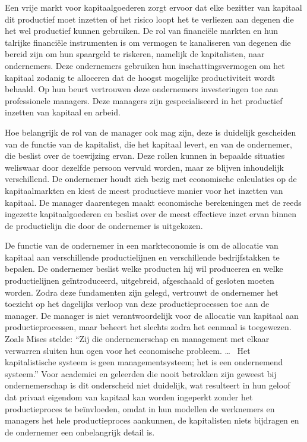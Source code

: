 Een vrije markt voor kapitaalgoederen zorgt ervoor dat elke bezitter van kapitaal dit productief moet inzetten of het risico loopt het te verliezen aan degenen die het wel productief kunnen gebruiken. De rol van financiële markten en hun talrijke financiële instrumenten is om vermogen te kanaliseren van degenen die bereid zijn om hun spaargeld te riskeren, namelijk de kapitalisten, naar ondernemers. Deze ondernemers gebruiken hun inschattingsvermogen om het kapitaal zodanig te alloceren dat de hoogst mogelijke productiviteit wordt behaald. Op hun beurt vertrouwen deze ondernemers investeringen toe aan professionele managers. Deze managers zijn gespecialiseerd in het productief inzetten van kapitaal en arbeid.

Hoe belangrijk de rol van de manager ook mag zijn, deze is duidelijk gescheiden van de functie van de kapitalist, die het kapitaal levert, en van de ondernemer, die beslist over de toewijzing ervan. Deze rollen kunnen in bepaalde situaties weliswaar door dezelfde persoon vervuld worden, maar ze blijven inhoudelijk verschillend. De ondernemer houdt zich bezig met economische calculaties op de kapitaalmarkten en kiest de meest productieve manier voor het inzetten van kapitaal. De manager daarentegen maakt economische berekeningen met de reeds ingezette kapitaalgoederen en beslist over de meest effectieve inzet ervan binnen de productielijn die door de ondernemer is uitgekozen.

De functie van de ondernemer in een markteconomie is om de allocatie van kapitaal aan verschillende productielijnen en verschillende bedrijfstakken te bepalen. De ondernemer beslist welke producten hij wil produceren en welke productielijnen geïntroduceerd, uitgebreid, afgeschaald of gesloten moeten worden. Zodra deze fundamenten zijn gelegd, vertrouwt de ondernemer het toezicht op het dagelijks verloop van deze productieprocessen toe aan de manager. De manager is niet verantwoordelijk voor de allocatie van kapitaal aan productieprocessen, maar beheert het slechts zodra het eenmaal is toegewezen. Zoals Mises stelde: ``Zij die ondernemerschap en management met elkaar verwarren sluiten hun ogen voor het economische probleem. \ldots~ Het kapitalistische systeem is geen managementsysteem; het is een ondernemend systeem.''\autocite{135} Voor academici en geleerden die nooit betrokken zijn geweest bij ondernemerschap is dit onderscheid niet duidelijk, wat resulteert in hun geloof dat privaat eigendom van kapitaal kan worden ingeperkt zonder het productieproces te beïnvloeden, omdat in hun modellen de werknemers en managers het hele productieproces aankunnen, de kapitalisten niets bijdragen en de ondernemer een onbelangrijk detail is.

